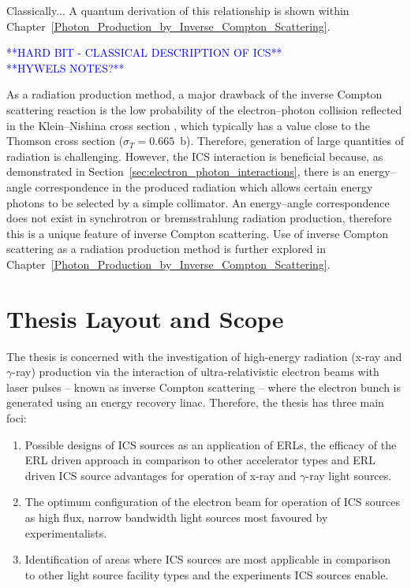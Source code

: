\documentclass[../main.tex]{subfiles}
\begin{document}
Classically...
A quantum derivation of this relationship is shown within Chapter~\ref{Photon_Production_by_Inverse_Compton_Scattering}.

\textcolor{blue}{**HARD BIT - CLASSICAL DESCRIPTION OF ICS** \\ **HYWELS NOTES?**}

As a radiation production method, a major drawback of the inverse Compton scattering reaction is the low probability of the electron--photon collision reflected in the Klein--Nishina cross section \cite{klein1929streuung}, which typically has a value close to the Thomson cross section ($\sigma_{T} = 0.665$~\si{\barn}). Therefore, generation of large quantities of radiation is challenging. However, the ICS interaction is beneficial because, as demonstrated in Section~\ref{sec:electron_photon_interactions}, there is an energy--angle correspondence in the produced radiation which allows certain energy photons to be selected by a simple collimator. An energy--angle correspondence does not exist in synchrotron or bremsstrahlung radiation production, therefore this is a unique feature of inverse Compton scattering. Use of inverse Compton scattering as a radiation production method is further explored in Chapter~\ref{Photon_Production_by_Inverse_Compton_Scattering}. 

\section{Thesis Layout and Scope}

The thesis is concerned with the investigation of high-energy radiation (x-ray and $\gamma$-ray) production via the interaction of ultra-relativistic electron beams with laser pulses -- known as inverse Compton scattering -- where the electron bunch is generated using an energy recovery linac. Therefore, the thesis has three main foci: 
\begin{enumerate}
    \item{Possible designs of ICS sources as an application of ERLs, the efficacy of the ERL driven approach in comparison to other accelerator types and ERL driven ICS source advantages for operation of x-ray and $\gamma$-ray light sources.}
    \item{The optimum configuration of the electron beam for operation of ICS sources as high flux, narrow bandwidth light sources most favoured by experimentalists.}
    \item{Identification of areas where ICS sources are most applicable in comparison to other light source facility types and the experiments ICS sources enable.}
\end{enumerate}
\end{document}
